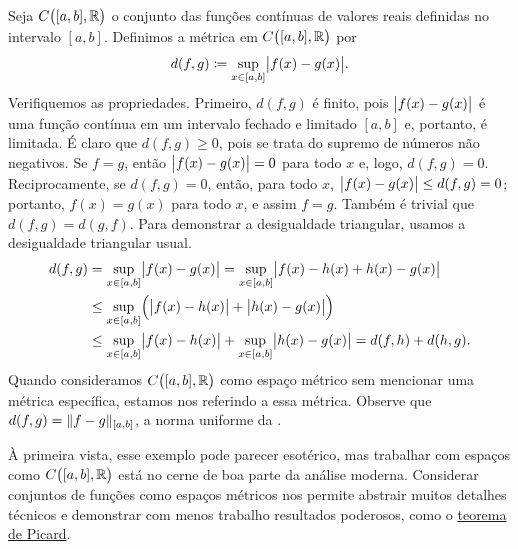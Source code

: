 \begin{example} \label{example:msC01}
Seja $C\bigl([a,b],{\mathbb{R}}\bigr)$ o conjunto das funções
contínuas de valores reais definidas no intervalo $[a,b]$.
Definimos a métrica em $C\bigl([a,b],{\mathbb{R}}\bigr)$ por
\begin{equation*}
d(f,g) \coloneqq \sup_{x \in [a,b]} \bigl\lvert {f(x)-g(x)} \bigr\rvert .
\end{equation*}
Verifiquemos as propriedades. Primeiro, $d(f,g)$ é finito, pois
$\bigl\lvert {f(x)-g(x)} \bigr\rvert$ é uma função contínua em um intervalo fechado e limitado
$[a,b]$ e, portanto, é limitada.
É claro que $d(f,g) \geq 0$, pois se trata do supremo de números não negativos.
Se $f = g$, então $\bigl\lvert {f(x)-g(x)} \bigr\rvert = 0$ para todo $x$ e, logo,
$d(f,g) = 0$. Reciprocamente, se $d(f,g) = 0$, então, para todo $x$,
$\bigl\lvert {f(x)-g(x)} \bigr\rvert \leq d(f,g) = 0$; portanto, $f(x) = g(x)$ para todo $x$,
e assim $f=g$. Também é trivial que $d(f,g) = d(g,f)$. Para demonstrar a
desigualdade triangular, usamos a desigualdade triangular usual.
\begin{equation*}
\begin{split}
d(f,g) & =
\sup_{x \in [a,b]} \bigl\lvert {f(x)-g(x)} \bigr\rvert =
\sup_{x \in [a,b]} \bigl\lvert {f(x)-h(x)+h(x)-g(x)} \bigr\rvert
\\
& \leq
\sup_{x \in [a,b]} \Bigl( \bigl\lvert {f(x)-h(x)} \bigr\rvert+\bigl\lvert {h(x)-g(x)} \bigr\rvert \Bigr)
\\
& \leq
\sup_{x \in [a,b]} \bigl\lvert {f(x)-h(x)} \bigr\rvert+
\sup_{x \in [a,b]} \bigl\lvert {h(x)-g(x)} \bigr\rvert = d(f,h) + d(h,g) .
\end{split}
\end{equation*}
Quando consideramos $C\bigl([a,b],{\mathbb{R}}\bigr)$ como espaço métrico sem mencionar
uma métrica específica, estamos nos referindo a essa métrica.
Observe que $d(f,g) = \lVert {f-g} \rVert_{[a,b]}$, a norma uniforme da
.

À primeira vista, esse exemplo pode parecer esotérico, mas trabalhar com
espaços como $C\bigl([a,b],{\mathbb{R}}\bigr)$ está no cerne de boa parte da análise
moderna. Considerar conjuntos de funções como espaços métricos nos permite
abstrair muitos detalhes técnicos e demonstrar com menos trabalho resultados
poderosos, como o \hyperref[thm:fs:picard]{teorema de Picard}.
\end{example}

